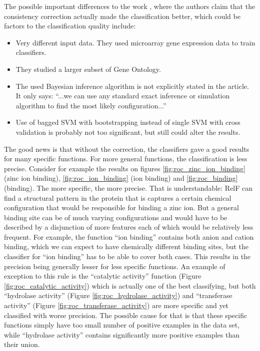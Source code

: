 \documentclass[11pt,twoside,a4paper]{book}
\begin{document}
The possible important differences to the work \cite{bnet},
where the authors claim that the consistency correction actually made the classification better,
which could be factors to the classification quality include:
\begin{itemize}
 \item Very different input data. They used microarray gene expression data to train classifiers.
 \item They studied a larger subset of Gene Ontology.
 \item The used Bayesian inference algorithm is not explicitly stated in the article. It only says: ``...we can use any standard exact inference or simulation algorithm to find the most likely configuration...''
 \item Use of bagged SVM with bootstrapping instead of single SVM with cross validation is probably not too significant, but still could alter the results.
\end{itemize}


The good news is that without the correction, the classifiers gave a good results
for many specific functions. 
For more general functions, the classification is less precise.
Consider for example the results on figures \ref{fig:roc_zinc_ion_binding} (zinc ion binding),
\ref{fig:roc_ion_binding} (ion binding) and \ref{fig:roc_binding} (binding).
The more specific, the more precise.
That is understandable:
RelF can find a structural pattern in the protein that is captures a certain chemical configuration
that would be responsible for binding a zinc ion.
But a general binding site can be of much varying configurations and would have to be described 
by a disjunction of more features each of which would be relatively less frequent.
For example, the function ``ion binding'' contains both anion and cation binding,
which we can expect to have chemically different binding sites,
but the classifier for ``ion binding'' has to be able to cover both cases.
This results in the precision being generally lesser for less specific functions.
An example of exception to this rule is the ``catalytic activity'' function (Figure \ref{fig:roc_catalytic_activity})
which is actually one of the best classifying,
but both ``hydrolase activity'' (Figure \ref{fig:roc_hydrolase_activity}) and ``transferase activity''
(Figure \ref{fig:roc_transferase_activity}) 
are more specific and yet classified with worse precision.
The possible cause for that is that these specific functions simply have too small number of positive examples in the data set,
while ``hydrolase activity'' contains significantly more positive examples than their union.
\end{document}
